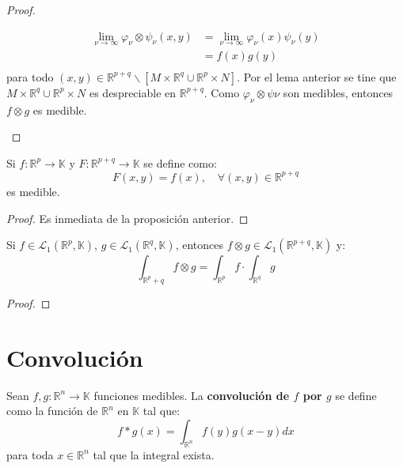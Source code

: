 \documentclass[12pt]{report}
\theoremstyle{largebreak}
\newcommand\cf[3]{\ensuremath{#1:#2\rightarrow#3}}
\begin{document}
\begin{proof}
\begin{enumerate}
\begin{equation*}
                \begin{split}
                    \lim_{ \nu\rightarrow\infty}\varphi_\nu\otimes \psi_\nu(x,y)&=\lim_{ \nu\rightarrow\infty}\varphi_\nu(x)\psi_\nu(y)\\
                    &=f(x)g(y)\\
                \end{split}
            \end{equation*}
            para todo $(x,y)\in \mathbb{R}^{ p+q}\backslash\left[M\times\mathbb{R}^q\cup\mathbb{R}^p\times N \right]$. Por el lema anterior se tine que $M\times\mathbb{R}^q\cup\mathbb{R}^p\times N$ es despreciable en $\mathbb{R}^{ p+q}$. Como $\varphi_\nu\otimes \psi\nu$ son medibles, entonces $f\otimes g$ es medible.
        \end{enumerate}
    \end{proof}

    \begin{cor}
        Si $\cf{f}{\mathbb{R}^p}{\mathbb{K}}$ y $\cf{F}{\mathbb{R}^{ p+q}}{\mathbb{K}}$ se define como:
        \begin{equation*}
            F(x,y)=f(x),\quad\forall (x,y)\in\mathbb{R}^{ p+q}
        \end{equation*}
        es medible.
    \end{cor}

    \begin{proof}
        Es inmediata de la proposición anterior.
    \end{proof}

    \begin{cor}
        Si $f\in\mathcal{L}_1(\mathbb{R}^p,\mathbb{K})$, $g\in\mathcal{L}_1(\mathbb{R}^q,\mathbb{K})$, entonces $f\otimes g\in \mathcal{L}_1(\mathbb{R}^{p+q},\mathbb{K})$ y:
        \begin{equation*}
            \int_{\mathbb{R}^{p}+q }f\otimes g=\int_{\mathbb{R}^p}f\cdot\int_{\mathbb{R}^q}g
        \end{equation*}
    \end{cor}

    \begin{proof}
        
    \end{proof}

    \section{Convolución}

    \begin{mydef}
        Sean $\cf{f,g}{\mathbb{R}^n}{\mathbb{K}}$ funciones medibles. La \textbf{convolución de $f$ por $g$} se define como la función de $\mathbb{R}^n$ en $\mathbb{K}$ tal que:
        \begin{equation*}
            f*g(x)=\int_{\mathbb{R}^n}f(y)g(x-y)dx
        \end{equation*}
        para toda $x\in\mathbb{R}^n$ tal que la integral exista.
    \end{mydef}
\end{document}
